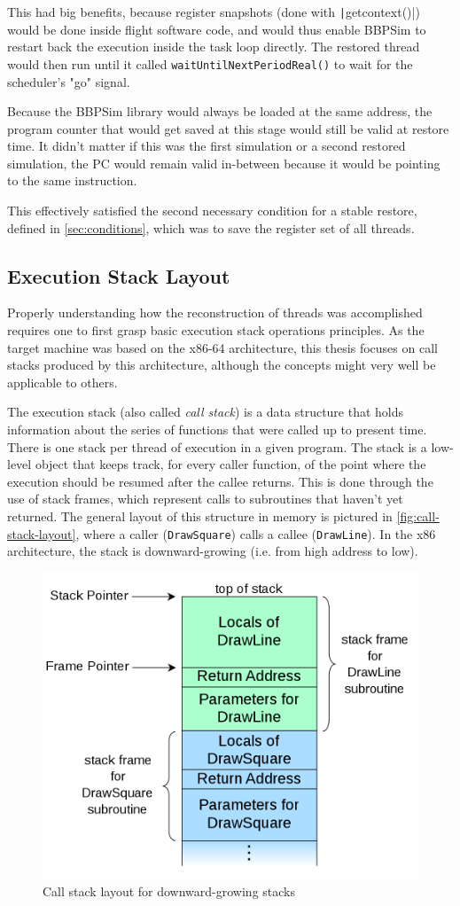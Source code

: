 This had big benefits, because register snapshots (done with \texttt|getcontext()|) would be done inside flight software code, and would thus enable BBPSim to restart back the execution inside the task loop directly. The restored thread would then run until it called \texttt{waitUntilNextPeriodReal()} to wait for the scheduler's "go" signal.

Because the \gls{BBPSim} library would always be loaded at the same address, the program counter that would get saved at this stage would still be valid at restore time. It didn't matter if this was the first simulation or a second restored simulation, the PC would remain valid in-between because it would be pointing to the same instruction. 

This effectively satisfied the second necessary condition for a stable restore, defined in \autoref{sec:conditions}, which was to save the register set of all threads.

\subsection*{Execution Stack Layout}
Properly understanding how the reconstruction of threads was accomplished requires one to first grasp basic execution stack operations principles. As the target machine was based on the x86-64 architecture, this thesis focuses on call stacks produced by this architecture, although the concepts might very well be applicable to others.

The execution stack (also called \textit{call stack}) is a data structure that holds information about the series of functions that were called up to present time. There is one stack per thread of execution in a given program. The stack is a low-level object that keeps track, for every caller function, of the point where the execution should be resumed after the callee returns. This is done through the use of stack frames, which represent calls to subroutines that haven't yet returned. The general layout of this structure in memory is pictured in \autoref{fig:call-stack-layout}, where a caller (\texttt{DrawSquare}) calls a callee (\texttt{DrawLine}). In the x86 architecture, the stack is downward-growing (i.e. from high address to low).

\begin{figure}[htbp]
	\centering
	\includegraphics[width=.6\linewidth,keepaspectratio]{art/call-stack-layout.png}
	\caption{Call stack layout for downward-growing stacks\cite{online:stack-img}}
	\label{fig:call-stack-layout}
\end{figure}

